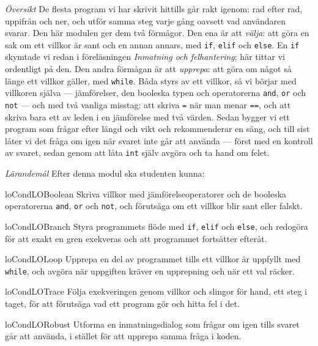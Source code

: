 \emph{Översikt}
De flesta program vi har skrivit hittills går rakt igenom: rad efter
rad, uppifrån och ner, och utför samma steg varje gång oavsett vad
användaren svarar.  Den här modulen ger dem två förmågor.  Den ena är
att \emph{välja}: att göra en sak om ett villkor är sant och en annan
annars, med \texttt{if}, \texttt{elif} och
\texttt{else}.  En \texttt{if} skymtade vi
redan i föreläsningen \emph{Inmatning och felhantering}; här tittar vi
ordentligt på den.  Den andra förmågan är att \emph{upprepa}: att göra
om något så länge ett villkor gäller, med \texttt{while}.  Båda
styrs av ett villkor, så vi börjar med villkoren själva --- jämförelser,
den booleska typen och operatorerna \texttt{and},
\texttt{or} och \texttt{not} --- och med två
vanliga misstag: att skriva
\texttt{=} när man menar \texttt{==}, och att
skriva bara ett av leden i en jämförelse med två värden.  Sedan bygger vi
ett program som frågar efter längd och vikt och rekommenderar en säng,
och till sist låter vi det fråga om igen när svaret inte går att använda
--- först med en kontroll av svaret, sedan genom att låta
\texttt{int} själv avgöra och ta hand om felet.

\emph{Lärandemål}
Efter denna modul ska studenten kunna:
\begin{restatable}{lo}{CondLOBoolean}\label{CondLOBoolean}%
  Skriva villkor med jämförelseoperatorer och de booleska operatorerna
  \texttt{and}, \texttt{or} och
  \texttt{not}, och förutsäga om ett villkor blir sant eller
  falskt.
\end{restatable}%
\begin{restatable}{lo}{CondLOBranch}\label{CondLOBranch}%
  Styra programmets flöde med \texttt{if},
  \texttt{elif} och \texttt{else}, och redogöra
  för att exakt en gren exekveras och att programmet fortsätter efteråt.
\end{restatable}%
\begin{restatable}{lo}{CondLOLoop}\label{CondLOLoop}%
  Upprepa en del av programmet tills ett villkor är uppfyllt med
  \texttt{while}, och avgöra när uppgiften kräver en
  upprepning och när ett val räcker.
\end{restatable}%
\begin{restatable}{lo}{CondLOTrace}\label{CondLOTrace}%
  Följa exekveringen genom villkor och slingor för hand, ett steg i
  taget, för att förutsäga vad ett program gör och hitta fel i det.
\end{restatable}%
\begin{restatable}{lo}{CondLORobust}\label{CondLORobust}%
  Utforma en inmatningsdialog som frågar om igen tills svaret går att
  använda, i stället för att upprepa samma fråga i koden.
\end{restatable}%

